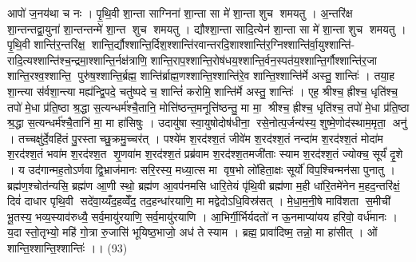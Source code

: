 आपो॑ ज॒नय॑था च नः । पृ॒थि॒वी शा॒न्ता साग्निना॑ शा॒न्ता सा मे॑ शा॒न्ता शुच॑ शमयतु । अ॒न्तरि॑क्ष शा॒न्तन्तद्वा॒युना॑ शा॒न्तन्तन्मे॑ शा॒न्त शुच॑ शमयतु । द्यौश्शा॒न्ता सादि॒त्येन॑ शा॒न्ता सा मे॑ शा॒न्ता शुच॑ शमयतु । पृ॒थि॒वी शान्ति॑र॒न्तरि॑क्ष॒॒ शान्ति॒र्द्यौश्शान्ति॒र्दिश॒श्शान्ति॑रवान्तरदि॒शाश्शान्ति॑र॒ग्निश्शान्ति॑र्वा॒युश्शान्ति॑- रादि॒त्यश्शान्ति॑श्च॒न्द्रमा॒श्शान्ति॒र्नक्ष॑त्राणि॒ शान्ति॒राप॒श्शान्ति॒रोष॑धय॒श्शान्ति॒र्वन॒स्पत॑य॒श्शान्ति॒र्गौश्शान्ति॑र॒जा शान्ति॒रश्व॒श्शान्ति॒ पुरु॑ष॒श्शान्ति॒र्ब्रह्म॒ शान्ति॑र्ब्राह्म॒णश्शान्ति॒श्शान्ति॑रे॒व शान्ति॒श्शान्ति॑र्मे अस्तु॒ शान्तिः॑ । तया॒ह शा॒न्त्या स॑र्वशा॒न्त्या मह्य॑न्द्वि॒पदे॒ चतु॑ष्पदे च॒ शान्तिं॑ करोमि॒ शान्ति॑र्मे अस्तु॒ शान्तिः॑ । एह॒ श्रीश्च॒ ह्रीश्च॒ धृति॑श्च॒ तपो॑ मे॒धा प्र॑ति॒ष्ठा श्र॒द्धा स॒त्यन्धर्म॑श्चै॒तानि॒ मोत्ति॑ष्ठन्त॒मनूत्ति॑ष्ठन्तु॒ मा मा॒॒ श्रीश्च॒ ह्रीश्च॒ धृति॑श्च॒ तपो॑ मे॒धा प्र॑ति॒ष्ठा श्र॒द्धा स॒त्यन्धर्म॑श्चै॒तानि॑ मा॒ मा हा॑सिषुः । उदायु॑षा स्वा॒युषोदोष॑धीना॒॒ रसे॒नोत्प॒र्जन्य॑स्य॒ शुष्मे॒णोद॑स्थाम॒मृता॒॒ अनु॑ । तच्चक्षु॑र्दे॒वहि॑तं पु॒रस्ताच्छु॒क्रमु॒च्चर॑त् । पश्ये॑म श॒रद॑श्श॒तं जीवे॑म श॒रद॑श्श॒तं नन्दा॑म श॒रद॑श्श॒तं मोदा॑म श॒रद॑श्श॒तं भवा॑म श॒रद॑श्श॒त शृ॒णवा॑म श॒रद॑श्श॒तं प्रब्र॑वाम श॒रद॑श्श॒तमजी॑ताः स्याम श॒रद॑श्श॒तं ज्योक्च॒ सूर्यं॑ दृ॒शे । य उद॑गान्मह॒तोऽर्णवाद्वि॒भ्राज॑मानः सरि॒रस्य॒ मध्या॒त्स मा वृष॒भो लो॑हिता॒क्षः सूर्यो॑ विप॒श्चिन्मन॑सा पुनातु । ब्रह्म॑ण॒श्चोत॑न्यसि॒ ब्रह्म॑ण आ॒णी स्थो॒ ब्रह्म॑ण आ॒वप॑नमसि धारि॒तेयं पृ॑थि॒वी ब्रह्म॑णा म॒ही धा॑रि॒तमे॑नेन म॒हद॒न्तरि॑क्षं॒ दिवं॑ दाधार पृथि॒वी सदे॑वा॒य्यँद॒हव्वेँद॒ तद॒हन्धा॑रयाणि॒ मा मद्वेदोऽधि॒विस्र॑सत् । मे॒धा॒म॒नी॒षे मावि॑शता स॒मीची॑ भू॒तस्य॒ भव्य॒स्याव॑रुध्यै॒ सर्व॒मायु॑रयाणि॒ सर्व॒मायु॑रयाणि । आ॒भिर्गी॒र्भिर्यदतो॑ न ऊ॒नमाप्या॑यय हरिवो॒ वर्ध॑मानः । य॒दा स्तो॒तृभ्यो॒ महि॑ गो॒त्रा रु॒जासि॑ भूयिष्ठ॒भाजो॒ अध॑ ते स्याम । ब्रह्म॒ प्रावा॑दिष्म॒ तन्नो॒ मा हा॑सीत् । ओं शान्ति॒श्शान्ति॒श्शान्तिः॑ ।। (93)

